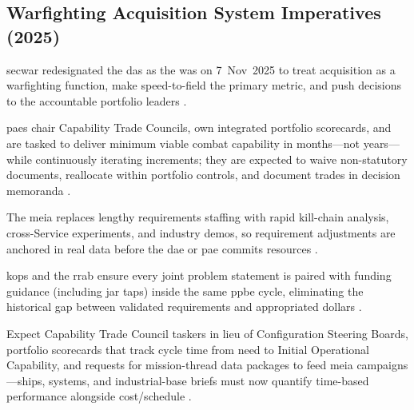 \documentclass[../main.tex]{subfiles}
\begin{document}

\subsection{Warfighting Acquisition System Imperatives (2025)}
\begin{description}[style=nextline,labelsep=0.5em,font=\bfseries]
  \item[\textbf{Purpose.}] \ac{secwar} redesignated the \ac{das} as the \ac{was} on 7~Nov~2025 to treat acquisition as a warfighting function, make speed-to-field the primary metric, and push decisions to the accountable portfolio leaders \autocite{secwar-was-memo-2025}.
  \item[\textbf{Portfolio accountability.}] \acp{pae} chair Capability Trade Councils, own integrated portfolio scorecards, and are tasked to deliver minimum viable combat capability in months---not years---while continuously iterating increments; they are expected to waive non-statutory documents, reallocate within portfolio controls, and document trades in decision memoranda \autocite{secwar-acq-transformation-2025,secwar-was-memo-2025}.
  \item[\textbf{Mission engineering and experimentation.}] The \ac{meia} replaces lengthy requirements staffing with rapid kill-chain analysis, cross-Service experiments, and industry demos, so requirement adjustments are anchored in real data before the \ac{dae} or \ac{pae} commits resources \autocite{secwar-was-memo-2025,secwar-jcids-reform-2025}.
  \item[\textbf{Requirements--budget coupling.}] \acp{kop} and the \ac{rrab} ensure every joint problem statement is paired with funding guidance (including \ac{jar} taps) inside the same \ac{ppbe} cycle, eliminating the historical gap between validated requirements and appropriated dollars \autocite{secwar-jcids-reform-2025}.
  \item[\textbf{Implications for \acp{edo}.}] Expect Capability Trade Council taskers in lieu of Configuration Steering Boards, portfolio scorecards that track cycle time from need to Initial Operational Capability, and requests for mission-thread data packages to feed \ac{meia} campaigns---ships, systems, and industrial-base briefs must now quantify time-based performance alongside cost/schedule \autocite{secwar-was-memo-2025,secwar-acq-transformation-2025}.
\end{description}
\end{document}
